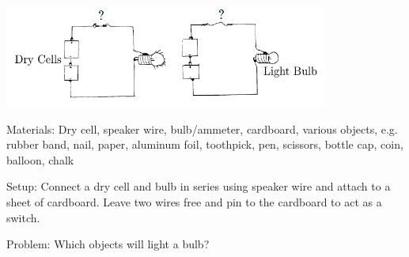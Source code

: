 \begin{center}
\includegraphics[width=0.8\textwidth]{./img/conductors-insulators-sci-meth.png}
\end{center}

\begin{description*}
\item[Materials:]{Dry cell, speaker wire, bulb/ammeter, cardboard, various objects, e.g. rubber band, nail, paper, aluminum foil, toothpick, pen, scissors, bottle cap, coin, balloon, chalk}
\item[Setup:]{Connect a dry cell and bulb in series using speaker wire and attach to a sheet of cardboard. Leave two wires free and pin to the cardboard to act as a switch.}
\item[Problem:]{Which objects will light a bulb?\\

}
\end{description*}
